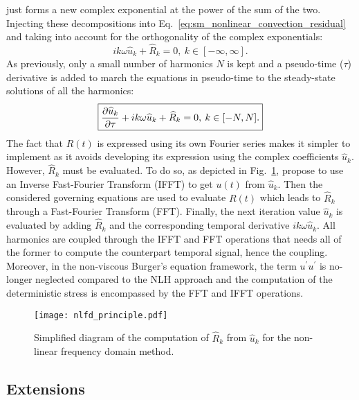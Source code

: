 just forms a new complex exponential at the power of the sum of the
two.
Injecting these decompositions into 
Eq.~\eqref{eq:sm_nonlinear_convection_residual} and taking into account
for the orthogonality of the complex exponentials:
\begin{equation}
	i k \omega \widehat{u}_k + \widehat{R}_k = 0, \: k \in [-\infty, \infty].
\end{equation}
As previously, only a small number of harmonics $N$ is kept and 
a pseudo-time ($\tau$) derivative is added to march the equations
in pseudo-time to the steady-state solutions of all the harmonics:
\begin{equation}
	\fbox{$
	\displaystyle \frac{\partial \widehat{u}_k}{\partial \tau} + 
	i k \omega \widehat{u}_k + \widehat{R}_k = 0, \: k \in [-N, N].
	$}
	\label{eq:sm_nlfd_subset_eq}
\end{equation}
The fact that $R(t)$ is expressed using its own Fourier series 
makes it simpler to implement 
as it avoids developing its expression using 
the complex coefficients $\widehat{u}_k$. 
However, $\widehat{R}_k$ must be evaluated. To do so, as depicted
in Fig.~\ref{fig:nlfd_principle}, \citet{McMullen2001}
propose to use an Inverse Fast-Fourier Transform (IFFT) to get
$u(t)$ from $\widehat{u}_k$. Then the considered governing equations
are used to evaluate $R(t)$ which leads to $\widehat{R}_k$
through a Fast-Fourier Transform (FFT). Finally, the next iteration value 
$\widehat{u}_k$
is evaluated by adding $\widehat{R}_k$ and 
the corresponding temporal derivative $i k \omega \widehat{u}_k$. All
harmonics are coupled through the IFFT and FFT operations
that needs all of the former to compute the counterpart temporal signal,
hence the coupling. Moreover, 
in the non-viscous Burger's equation framework, 
the term $u^\prime u^\prime$ is no-longer neglected compared to the
NLH approach and the computation of the deterministic stress is encompassed
by the FFT and IFFT operations.
\begin{figure}[htbp]
  \centering
  \texttt{[image: nlfd\_principle.pdf]}
  \caption{Simplified diagram of the computation of $\widehat{R}_k$ from $\widehat{u}_k$
  for the non-linear frequency domain method.}
  \label{fig:nlfd_principle}
\end{figure}

\subsection{Extensions}

